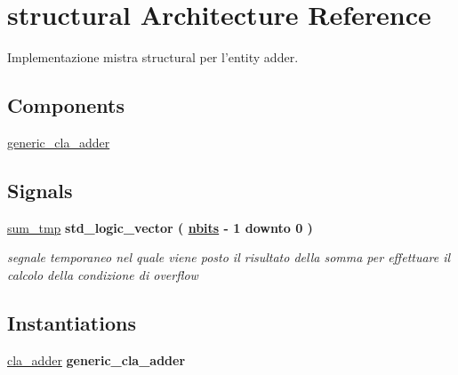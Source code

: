 \hypertarget{classadder_1_1structural}{\section{structural Architecture Reference}
\label{classadder_1_1structural}
}


Implementazione mistra structural per l'entity adder.  


\subsection*{Components}
 \begin{DoxyCompactItemize}
\item 
\hyperlink{group___adder_gae7148956d4ef1d1cd14f35060634b9c3}{generic\+\_\+cla\+\_\+adder}  {\bfseries }  
\end{DoxyCompactItemize}
\subsection*{Signals}
 \begin{DoxyCompactItemize}
\item 
\hyperlink{group___adder_ga590914af948ec283f1371002f2f76720}{sum\+\_\+tmp} {\bfseries \textcolor{vhdlchar}{std\+\_\+logic\+\_\+vector}\textcolor{vhdlchar}{ }\textcolor{vhdlchar}{(}\textcolor{vhdlchar}{ }\textcolor{vhdlchar}{ }\textcolor{vhdlchar}{ }\textcolor{vhdlchar}{ }{\bfseries \hyperlink{group___adder_gae1435c07d0cd54b521535e2f8de6f94e}{nbits}} \textcolor{vhdlchar}{-\/}\textcolor{vhdlchar}{ } \textcolor{vhdldigit}{1} \textcolor{vhdlchar}{ }\textcolor{vhdlchar}{downto}\textcolor{vhdlchar}{ }\textcolor{vhdlchar}{ } \textcolor{vhdldigit}{0} \textcolor{vhdlchar}{ }\textcolor{vhdlchar}{)}\textcolor{vhdlchar}{ }} 
\begin{DoxyCompactList}\small\item\em segnale temporaneo nel quale viene posto il risultato della somma per effettuare il calcolo della condizione di overflow \end{DoxyCompactList}\end{DoxyCompactItemize}
\subsection*{Instantiations}
 \begin{DoxyCompactItemize}
\item 
\hyperlink{classadder_1_1structural_a94015e32a32cd4c5be09b1ddde822259}{cla\+\_\+adder}  {\bfseries generic\+\_\+cla\+\_\+adder}   
\end{DoxyCompactItemize}


